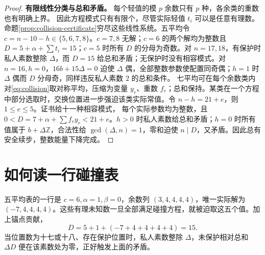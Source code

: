 \documentclass[11pt,a4paper,oneside,openany]{book}
\newcommand{\Z}{\mathbb Z}
\theoremstyle{definition}
\numberwithin{equation}{chapter}
\begin{document}
\begin{proof}
\par\noindent\textbf{有限线性分类与总和矛盾。}
每个轻值的模 $p$ 余数只有 $p$ 种，各余类的重数也有明确上界。
因此方程模式只有有限个，尽管实际轻值 $t_i$ 可以是任意有理数。
命题\ref{prop:collision-certificate}穷尽这些线性系统。五平均令 $c=n-10-h\in\{5,6,7,8\}$。$c=7,8$ 无解；$c=6$ 的两个解均为整数且 $D=5+\alpha+\sum t_i=15$；$c=5$ 时所有 $D$ 的分母为奇数。对 $n=17,18$，有保护时私人素数整除 $\Delta$，而 $D=15$ 给总和矛盾；无保护时没有相容模式。对 $n=16,h=0$，$16b+15\Delta=0$ 迫使 $\Delta$ 偶，全部整数参数使配置同奇偶；$h=1$ 时 $\Delta$ 偶而 $D$ 分母奇，同样违反私人素数 $2$ 的总和条件。
七平均可在每个余数类内对\eqref{eq:collision}取对称平均，压缩为变量 $y_r$、重数 $f_r$；总和保持。某类在一个方程中部分选取时，交换位置进一步强迫该类实际常值。令 $n-h=21+e$，则 $1\le e\le5$。证书给十一种相容模式，
每个实际参数均为整数，且 $0<D=7+\alpha+\sum f_ry_r<21+e$。$h>0$ 时私人素数给总和矛盾；$h=0$ 时所有值属于 $b+\Delta\Z$，合法性给 $\gcd(\Delta,n)=1$，零和迫使 $n\mid D$，又矛盾。因此总有安全续步，整数能量下降完成。
\end{proof}

\section{如何读一行碰撞表}
五平均表的一行是 $c=6,\alpha=1,\beta=0$，余数列 $(3,4,4,4,4)$，唯一实际解为 $(-7,4,4,4,4)$。这些有理未知数一旦全部满足碰撞方程，就被迫取这五个值。加上锚点贡献，
\[D=5+1+(-7+4+4+4+4)=15.
\]
当位置数为十七或十八、存在保护位置时，私人素数整除 $\Delta$，未保护相对总和 $\Delta D$ 便在该素数处为零，正好触发上面的矛盾。
\end{document}
